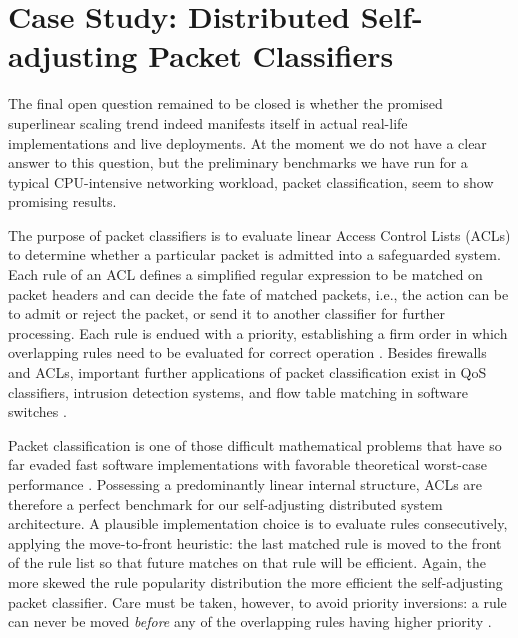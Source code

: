 \documentclass[letterpaper,twocolumn,10pt]{article}
\begin{document}
\section{Case Study: Distributed Self-adjusting Packet Classifiers}
\label{sec:packet-classifier}

The final open question remained to be closed is whether the promised superlinear scaling trend indeed manifests itself in actual real-life implementations and live deployments. At the moment we do not have a clear answer to this question, but the preliminary benchmarks we have run for a typical CPU-intensive networking workload, packet classification, seem to show promising results.

The purpose of packet classifiers is to evaluate linear Access Control Lists (ACLs) \cite{gupta2001algorithms, 10.1145/2619239.2626294, 10.1145/1851275.1851208, 10.1145/1851275.1851208, 10.1145/3359989.3365431} to determine whether a particular packet is admitted into a safeguarded system. Each rule of an ACL defines a simplified regular expression to be matched on packet headers and can decide the fate of matched packets, i.e., the action can be to admit or reject the packet, or send it to another classifier for further processing. Each rule is endued with a priority, establishing a firm order in which overlapping rules need to be evaluated for correct operation \cite{10.1145/2619239.2626294}. Besides firewalls and ACLs, important further applications of packet classification exist in QoS classifiers, intrusion detection systems, and flow table matching in software switches \cite{188960, 10.1145/3452296.3472914}.

Packet classification is one of those difficult mathematical problems that have so far evaded fast software implementations with favorable theoretical worst-case performance  \cite{gupta2001algorithms, 10.1145/3359989.3365431}. Possessing a predominantly linear internal structure, ACLs are therefore a perfect benchmark for our self-adjusting distributed system architecture. A plausible implementation choice is to evaluate rules consecutively, applying the move-to-front heuristic: the last matched rule is moved to the front of the rule list so that future matches on that rule will be efficient. Again, the more skewed the rule popularity distribution the more efficient the self-adjusting packet classifier. Care must be taken, however, to avoid priority inversions: a rule can never be moved \emph{before} any of the overlapping rules having higher priority \cite{10.1145/2619239.2626294}.
\end{document}
